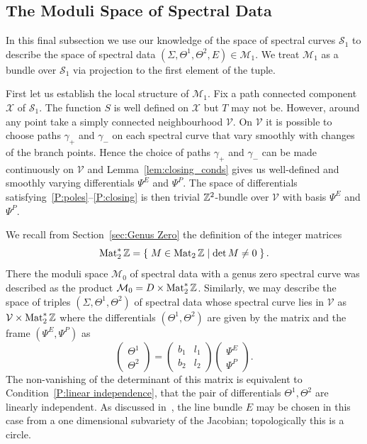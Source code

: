 \documentclass{article}
\begin{document}

\subsection{The Moduli Space of Spectral Data}
In this final subsection we use our knowledge of the space of spectral curves $\mathcal{S}_1$ to describe the space of spectral data $(\Sigma,\Theta^1,\Theta^2,E)\in\mathcal{M}_1$. We treat $\mathcal{M}_1$ as a bundle over $\mathcal{S}_1$ via projection to the first element of the tuple.

First let us establish the local structure of $\mathcal{M}_1$. 
Fix a path connected component $\mathcal{X}$ of $\mathcal{S}_1$.
The function $S$ is well defined on $\mathcal{X}$ but $T$ may not be. 
However, around any point take a simply connected neighbourhood $\mathcal{V}$. On $\mathcal{V}$ it is possible to choose paths $\gamma_+$ and $\gamma_-$ on each spectral curve that vary smoothly with changes of the branch points. Hence the choice of paths $\gamma_+$ and $\gamma_-$ can be made continuously on $\mathcal{V}$ and Lemma~\ref{lem:closing_conds} gives us well-defined and smoothly varying differentials $\Psi^E$ and $\Psi^P$. The space of differentials satisfying~\ref{P:poles}--\ref{P:closing} is then trivial $\mathbb{Z}^2$-bundle over $\mathcal{V}$ with basis $\Psi^E$ and $\Psi^P$.

We recall from Section~\ref{sec:Genus Zero} the definition of the integer matrices 
\[
\operatorname{Mat}_2^*\mathbb{Z} = \left\{\;  M \in \operatorname{Mat}_2\mathbb{Z}  \;\middle|\; \det M \neq 0 \;\right\}. 
\]
There the moduli space $\mathcal{M}_0$ of spectral data with a genus zero spectral curve was described as the product $\mathcal{M}_0 = D \times \operatorname{Mat}_2^*\mathbb{Z}$. Similarly, we may describe the space of triples $(\Sigma,\Theta^1,\Theta^2)$ of spectral data whose spectral curve lies in $\mathcal{V}$ as $\mathcal{V} \times \operatorname{Mat}_2^*\mathbb{Z}$ where the differentials $(\Theta^1,\Theta^2)$ are given by the matrix and the frame $(\Psi^E,\Psi^P)$ as
\[
\begin{pmatrix}
\Theta^1 \\ \Theta^2
\end{pmatrix}
=
\begin{pmatrix}
b_1 & l_1 \\
b_2 & l_2
\end{pmatrix}
\begin{pmatrix}
\Psi^E \\ \Psi^P
\end{pmatrix}.
\]
The non-vanishing of the determinant of this matrix is equivalent to Condition~\ref{P:linear independence}, that the pair of differentials $\Theta^1, \Theta^2$ are linearly independent. As discussed in~\cite[p.~690]{Hitchin1990}, the line bundle $E$ may be chosen in this case from a one dimensional subvariety of the Jacobian; topologically this is a circle.
\end{document}
